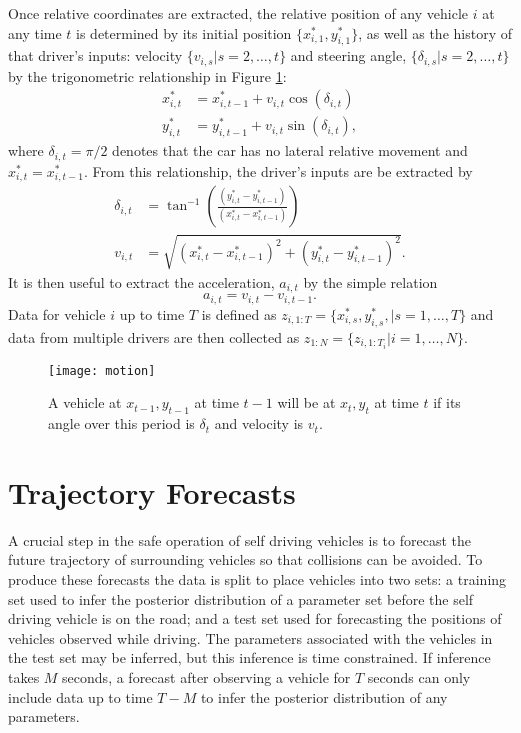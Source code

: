 \documentclass[12pt,a4paper]{article}\usepackage[]{graphicx}\usepackage[]{color}
\begin{document}
Once relative coordinates are extracted, the relative position of any vehicle $i$ at any time $t$ is determined by its initial position $\{x^*_{i, 1}, y^*_{i, 1}\}$, as well as the history of that driver's inputs: velocity $\{v_{i, s} | s = 2, \dots, t\}$ and steering angle, $\{\delta_{i, s} | s = 2, \dots, t\}$ by the trigonometric relationship in Figure \ref{fig:motion}:
\begin{align}
x^*_{i, t} &= x^*_{i, t-1} + v_{i, t} \cos(\delta_{i, t}) \label{xEq} \\
y^*_{i, t} &= y^*_{i, t-1} + v_{i, t} \sin(\delta_{i, t}) \label{yEq},
\end{align}
where $\delta_{i, t} = \pi/2$ denotes that the car has no lateral relative movement and $x^*_{i, t} = x^*_{i, t-1}$.
From this relationship, the driver's inputs are be extracted by
\begin{align}
\delta_{i, t} &= \tan^{-1}\left(\frac{(y^*_{i, t} - y^*_{i, t-1})}{(x^*_{i, t} - x^*_{i, t-1})} \right) \label{dEq} \\
v_{i, t} &= \sqrt{(x^*_{i, t} - x^*_{i, t-1})^2 + (y^*_{i, t} - y^*_{i, t-1})^2} \label{vEq}.
\end{align}
It is then useful to extract the acceleration, $a_{i, t}$ by the simple relation
\begin{equation}
\label{aEq}
a_{i, t} = v_{i, t} - v_{i, t-1}. 
\end{equation}
Data for vehicle $i$ up to time $T$ is defined as $z_{i, 1:T} = \{x^*_{i, s}, y^*_{i, s}, | s = 1, \dots, T\}$ and data from multiple drivers are then collected as $z_{1:N} = \{z_{i, 1:T_i} | i = 1, \dots, N\}$.
\begin{figure}
\centering
\texttt{[image: motion]}
\caption{A vehicle at $x_{t-1}, y_{t-1}$ at time $t-1$ will be at $x_t, y_t$ at time $t$ if its angle over this period is $\delta_t$ and velocity is $v_t$.}
\label{fig:motion}
\end{figure}

\section{Trajectory Forecasts}
\label{sec:trajForecasts}

A crucial step in the safe operation of self driving vehicles is to forecast the future trajectory of surrounding vehicles so that collisions can be avoided. To produce these forecasts the data is split to place vehicles into two sets: a training set used to infer the posterior distribution of a parameter set before the self driving vehicle is on the road; and a test set used for forecasting the positions of vehicles observed while driving. The parameters associated with the vehicles in the test set may be inferred, but this inference is time constrained. If inference takes $M$ seconds, a forecast after observing a vehicle for $T$ seconds can only include data up to time $T - M$ to infer the posterior distribution of any parameters.
\end{document}
